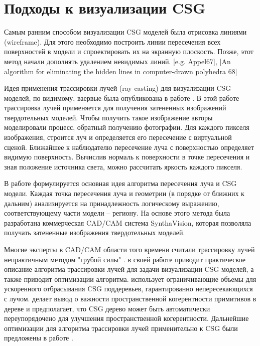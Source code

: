 {{{{{{{\section{Подходы к визуализации CSG} \label{sect_csg_vis}

Самым ранним способом визуализации CSG моделей была отрисовка линиями (wireframe). Для этого необходимо построить линии пересечения всех поверхностей в модели и спроектировать их на экранную плоскость. Позже, этот метод начали дополнять удалением невидимых линий. [e.g. Appel67], [An algorithm for eliminating the hidden lines in computer-drawn polyhedra 68]

Идея применения трассировки лучей (ray casting) для визуализации CSG моделей, по видимому, ваервые была опубликована в работе . В этой работе трассировка лучей применяется для получения затененных изображений твердотельных моделей. Чтобы получить такое изображение авторы моделировали процесс, обратный получению фотографии. Для каждого пикселя изображения, строится луч и определяется его пересечение с виртуальной сценой. Ближайшее к наблюдателю пересечение луча с поверхностью определяет видимую поверхность. Вычислив нормаль к поверхности в точке пересечения и зная положение источника света, можно рассчитать яркость каждого пикселя. 

В работе формулируется основная идея алгоритма пересечения луча и CSG модели. Каждая точка пересечения луча и геометрии (в порядке от ближних к дальним) анализируется на принадлежность логическому выражению, соответствующему части модели -- региону. На основе этого метода была разработана коммерческая CAD/CAM система SynthaVision, которая позволяла получать затененные изображения твердотельных моделей.

Многие эксперты в CAD/CAM области того времени считали трассировку лучей непрактичным методом "грубой силы" \todo{[Roth]}. \todo{[Roth]} в своей работе приводит практическое описание алгоритма трассировки лучей для задачи визуализации CSG моделей, а также приводит оптимизации алгоритма. \todo{[Roth]} использует ограничивающие объемы для ускоренного отбрасывания CSG поддеревьев, гарантированно непересекающихся с лучом. \todo{[Roth]} делает вывод о важности пространственной когерентности примитивов в дереве и предполагает, что CSG дерево может быть автоматически переупорядочено для улучшения пространственной когерентности. Дальнейшие оптимизации для алгоритма трассировки лучей применительно к CSG были предложены в работе \todo{[Bronsvoort84]}.

}}}}}}}
